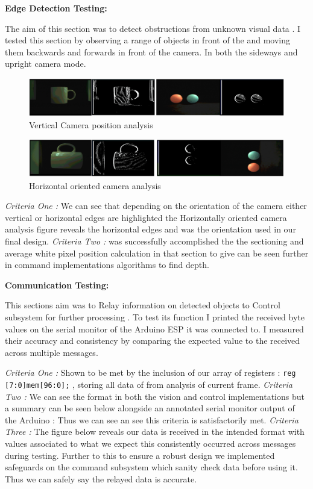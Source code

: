\documentclass[10pt,twoside]{article}
\begin{document}
\textbf{Edge Detection Testing: }

The aim of this section was to detect obstructions from unknown visual data . I tested this section by observing a range of objects in front of the and moving them backwards and forwards in front of the camera. In both the sideways and upright camera mode.

\begin{figure}[hbt!]
    \centering
    \includegraphics[scale=0.3]{VerticalOrientEdge.PNG}
    \captionsetup{justification=centering}
    \caption{Vertical Camera position analysis}
\end{figure}

\begin{figure}[hbt!]
    \centering
    \includegraphics[scale=0.295]{HorizontalOrientEdge.PNG}
    \captionsetup{justification=centering}
    \caption{Horizontal oriented camera analysis}
\end{figure}

\textit{Criteria One : } We can see that depending on the orientation of the camera either vertical or horizontal edges are highlighted the Horizontally oriented camera analysis figure reveals the horizontal edges and was the orientation used in our final design. \textit{Criteria Two : } was successfully accomplished the the sectioning and average white pixel  position calculation in that section to give can be seen further in command implementations algorithms to find depth. 

\textbf{Communication Testing: }

This sections aim was to Relay information on detected objects to Control subsystem for further processing . To test its function I printed the received byte values on the serial monitor of the Arduino ESP it was connected to. I measured their accuracy and consistency by comparing the expected value to the received across multiple messages. 

\textit{Criteria One : } Shown to  be met by the inclusion of our array of registers :  \texttt{reg [7:0]mem[96:0];} , storing all data of from analysis of current frame. \textit{Criteria Two : } We can see the format in both the vision and control implementations but a summary can be seen below alongside an annotated serial monitor output of the Arduino : Thus we can see an see this criteria is satisfactorily met. \textit{Criteria Three : } The figure below reveals our data is received in the intended format with values associated to what we expect this consistently occurred across messages during testing. Further to this to ensure a robust design we implemented safeguards on the command subsystem which sanity check data before using it. Thus we can safely say the relayed data is accurate. 
\end{document}
